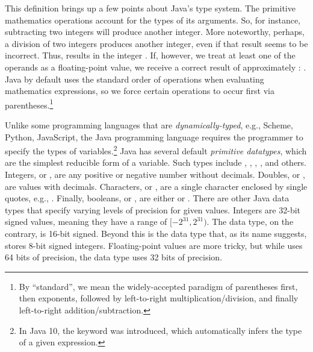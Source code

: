 This definition brings up a few points about Java's type system. The primitive mathematics operations account for the types of its arguments. So, for instance, subtracting two integers will produce another integer. More noteworthy, perhaps, a division of two integers produces another integer, even if that result seems to be incorrect. Thus,  results in the integer . If, however, we treat at least one of the operands as a floating-point value, we receive a correct result of approximately : . Java by default uses the standard order of operations when evaluating mathematics expressions, so we force certain operations to occur first via parentheses.\footnote{By ``standard'', we mean the widely-accepted paradigm of parentheses first, then exponents, followed by left-to-right multiplication/division, and finally left-to-right addition/subtraction.}

Unlike some programming languages that are \textit{dynamically-typed}, e.g., Scheme, Python, JavaScript, the Java programming language requires the programmer to specify the types of variables.\footnote{In Java 10, the  keyword was introduced, which automatically infers the type of a given expression.} Java has several default \textit{primitive datatypes}, which are the simplest reducible form of a variable. Such types include , , , , and others. Integers, or , are any positive or negative number without decimals. Doubles, or , are values with decimals. Characters, or , are a single character enclosed by single quotes, e.g., . Finally, booleans, or , are either  or . There are other Java data types that specify varying levels of precision for given values. Integers are 32-bit signed values, meaning they have a range of $[-2^{31}, 2^{31})$. The  data type, on the contrary, is 16-bit signed. Beyond this is the  data type that, as its name suggests, stores 8-bit signed integers. Floating-point values are more tricky, but while  uses 64 bits of precision, the  data type uses 32 bits of precision.


